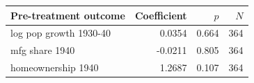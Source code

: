 \begin{tabular}{lrrr}
\toprule
Pre-treatment outcome & Coefficient & $p$ & $N$ \\
\midrule
log pop growth 1930-40 & 0.0354 & 0.664 & 364 \\
mfg share 1940 & -0.0211 & 0.805 & 364 \\
homeownership 1940 & 1.2687 & 0.107 & 364 \\
\bottomrule
\end{tabular}